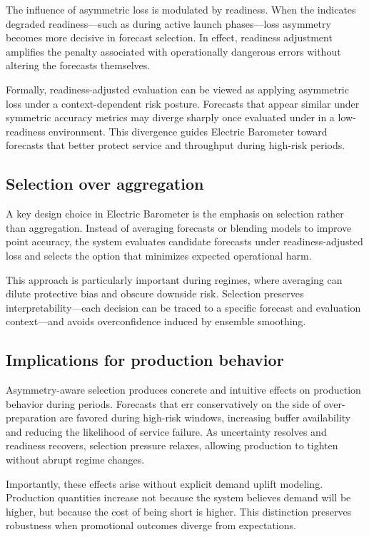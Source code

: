The influence of asymmetric loss is modulated by readiness. When the \RAL{} indicates degraded
readiness—such as during active \LTO{} launch phases—loss asymmetry becomes more decisive in
forecast selection. In effect, readiness adjustment amplifies the penalty associated with operationally
dangerous errors without altering the forecasts themselves.

Formally, readiness-adjusted evaluation can be viewed as applying asymmetric loss under a
context-dependent risk posture. Forecasts that appear similar under symmetric accuracy metrics
may diverge sharply once evaluated under \CWSL{} in a low-readiness environment. This divergence
guides Electric Barometer toward forecasts that better protect service and throughput during
high-risk periods.

\subsection{Selection over aggregation}
\label{subsec:selection-over-aggregation}

A key design choice in Electric Barometer is the emphasis on selection rather than aggregation.
Instead of averaging forecasts or blending models to improve point accuracy, the system evaluates
candidate forecasts under readiness-adjusted loss and selects the option that minimizes expected
operational harm.

This approach is particularly important during \LTO{} regimes, where averaging can dilute
protective bias and obscure downside risk. Selection preserves interpretability—each decision can
be traced to a specific forecast and evaluation context—and avoids overconfidence induced by
ensemble smoothing.

\subsection{Implications for production behavior}
\label{subsec:production-implications}

Asymmetry-aware selection produces concrete and intuitive effects on production behavior during
\LTO{} periods. Forecasts that err conservatively on the side of over-preparation are favored during
high-risk windows, increasing buffer availability and reducing the likelihood of service failure.
As uncertainty resolves and readiness recovers, selection pressure relaxes, allowing production to
tighten without abrupt regime changes.

Importantly, these effects arise without explicit demand uplift modeling. Production quantities
increase not because the system believes demand will be higher, but because the cost of being short
is higher. This distinction preserves robustness when promotional outcomes diverge from
expectations.

